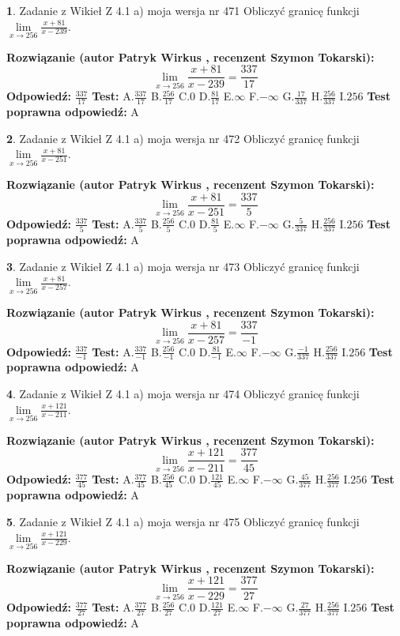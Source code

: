 \documentclass[12pt, a4paper]{article}
\theoremstyle{definition} %
\newtheorem{zad}{}
\newcommand{\zadStart}[1]{\begin{zad}#1\newline}
\newcommand{\zadStop}{\end{zad}}
\newcommand{\rozwStart}[2]{\noindent \textbf{Rozwiązanie (autor #1 , recenzent #2): }\newline}
\newcommand{\rozwStop}{\newline}
\newcommand{\odpStart}{\noindent \textbf{Odpowiedź:}\newline}
\newcommand{\odpStop}{\newline}
\newcommand{\testStart}{\noindent \textbf{Test:}\newline}
\newcommand{\testStop}{\newline}
\newcommand{\kluczStart}{\noindent \textbf{Test poprawna odpowiedź:}\newline}
\newcommand{\kluczStop}{\newline}
\begin{document}
\zadStart{Zadanie z Wikieł Z 4.1 a) moja wersja nr 471}
Obliczyć granicę funkcji $\lim\limits_{x\to256}\frac{x+81}{x-239}$.
\zadStop
\rozwStart{Patryk Wirkus}{Szymon Tokarski}
$$\lim\limits_{x\to256}\frac{x+81}{x-239} = \frac{337}{17}$$
\rozwStop
\odpStart
$\frac{337}{17}$
\odpStop
\testStart
A.$\frac{337}{17}$
B.$\frac{256}{17}$
C.$0$
D.$\frac{81}{17}$
E.$\infty$
F.$-\infty$
G.$\frac{17}{337}$
H.$\frac{256}{337}$
I.$256$
\testStop
\kluczStart
A
\kluczStop



\zadStart{Zadanie z Wikieł Z 4.1 a) moja wersja nr 472}
Obliczyć granicę funkcji $\lim\limits_{x\to256}\frac{x+81}{x-251}$.
\zadStop
\rozwStart{Patryk Wirkus}{Szymon Tokarski}
$$\lim\limits_{x\to256}\frac{x+81}{x-251} = \frac{337}{5}$$
\rozwStop
\odpStart
$\frac{337}{5}$
\odpStop
\testStart
A.$\frac{337}{5}$
B.$\frac{256}{5}$
C.$0$
D.$\frac{81}{5}$
E.$\infty$
F.$-\infty$
G.$\frac{5}{337}$
H.$\frac{256}{337}$
I.$256$
\testStop
\kluczStart
A
\kluczStop



\zadStart{Zadanie z Wikieł Z 4.1 a) moja wersja nr 473}
Obliczyć granicę funkcji $\lim\limits_{x\to256}\frac{x+81}{x-257}$.
\zadStop
\rozwStart{Patryk Wirkus}{Szymon Tokarski}
$$\lim\limits_{x\to256}\frac{x+81}{x-257} = \frac{337}{-1}$$
\rozwStop
\odpStart
$\frac{337}{-1}$
\odpStop
\testStart
A.$\frac{337}{-1}$
B.$\frac{256}{-1}$
C.$0$
D.$\frac{81}{-1}$
E.$\infty$
F.$-\infty$
G.$\frac{-1}{337}$
H.$\frac{256}{337}$
I.$256$
\testStop
\kluczStart
A
\kluczStop



\zadStart{Zadanie z Wikieł Z 4.1 a) moja wersja nr 474}
Obliczyć granicę funkcji $\lim\limits_{x\to256}\frac{x+121}{x-211}$.
\zadStop
\rozwStart{Patryk Wirkus}{Szymon Tokarski}
$$\lim\limits_{x\to256}\frac{x+121}{x-211} = \frac{377}{45}$$
\rozwStop
\odpStart
$\frac{377}{45}$
\odpStop
\testStart
A.$\frac{377}{45}$
B.$\frac{256}{45}$
C.$0$
D.$\frac{121}{45}$
E.$\infty$
F.$-\infty$
G.$\frac{45}{377}$
H.$\frac{256}{377}$
I.$256$
\testStop
\kluczStart
A
\kluczStop



\zadStart{Zadanie z Wikieł Z 4.1 a) moja wersja nr 475}
Obliczyć granicę funkcji $\lim\limits_{x\to256}\frac{x+121}{x-229}$.
\zadStop
\rozwStart{Patryk Wirkus}{Szymon Tokarski}
$$\lim\limits_{x\to256}\frac{x+121}{x-229} = \frac{377}{27}$$
\rozwStop
\odpStart
$\frac{377}{27}$
\odpStop
\testStart
A.$\frac{377}{27}$
B.$\frac{256}{27}$
C.$0$
D.$\frac{121}{27}$
E.$\infty$
F.$-\infty$
G.$\frac{27}{377}$
H.$\frac{256}{377}$
I.$256$
\testStop
\kluczStart
A
\kluczStop
\end{document}

